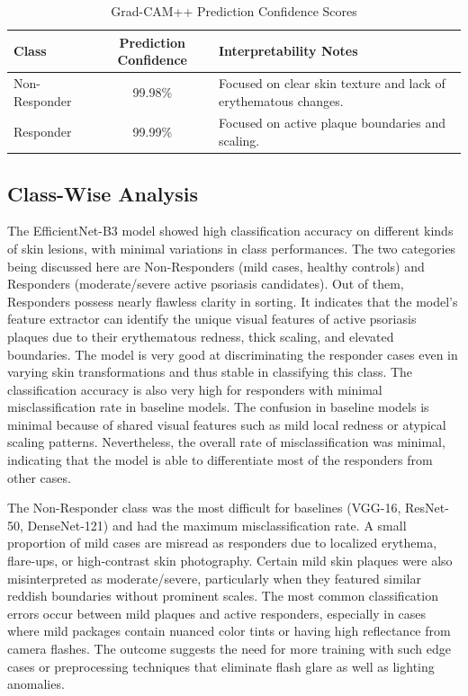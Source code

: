 \documentclass[11pt,journal,compsoc]{IEEEtran}
\begin{document}
\begin{table}[t]
\centering
\caption{Grad-CAM++ Prediction Confidence Scores}
\label{tab:gradcam_scores}
\begin{tabular}{lcl}
\toprule
Class & Prediction Confidence & Interpretability Notes \\
\midrule
Non-Responder & 99.98\% & Focused on clear skin texture and lack of erythematous changes. \\
Responder & 99.99\% & Focused on active plaque boundaries and scaling. \\
\bottomrule
\end{tabular}
\end{table}

\subsection{Class-Wise Analysis}
The EfficientNet-B3 model showed high classification accuracy on different kinds of skin lesions, with minimal variations in class performances.
The two categories being discussed here are Non-Responders (mild cases, healthy controls) and Responders (moderate/severe active psoriasis candidates). Out of them, Responders possess nearly flawless clarity in sorting. It indicates that the model's feature extractor can identify the unique visual features of active psoriasis plaques due to their erythematous redness, thick scaling, and elevated boundaries. The model is very good at discriminating the responder cases even in varying skin transformations and thus stable in classifying this class. The classification accuracy is also very high for responders with minimal misclassification rate in baseline models. The confusion in baseline models is minimal because of shared visual features such as mild local redness or atypical scaling patterns. Nevertheless, the overall rate of misclassification was minimal, indicating that the model is able to differentiate most of the responders from other cases.

The Non-Responder class was the most difficult for baselines (VGG-16, ResNet-50, DenseNet-121) and had the maximum misclassification rate. A small proportion of mild cases are misread as responders due to localized erythema, flare-ups, or high-contrast skin photography. Certain mild skin plaques were also misinterpreted as moderate/severe, particularly when they featured similar reddish boundaries without prominent scales. The most common classification errors occur between mild plaques and active responders, especially in cases where mild packages contain nuanced color tints or having high reflectance from camera flashes. The outcome suggests the need for more training with such edge cases or preprocessing techniques that eliminate flash glare as well as lighting anomalies.
\end{document}
